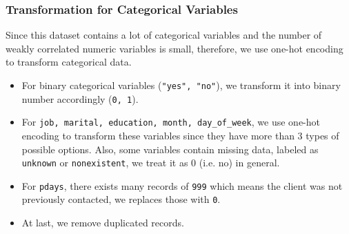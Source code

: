 \documentclass[11pt,a4paper]{article}
\begin{document}
    \subsubsection{Transformation for Categorical Variables}
    Since this dataset contains a lot of categorical variables and the number of weakly correlated numeric variables is small, therefore, we use one-hot encoding to transform categorical data.
    \begin{itemize}
        \item 
            For binary categorical variables (\texttt{"yes", "no"}), we transform it into binary number accordingly (\texttt{0, 1}).
            
        \item
            For \texttt{job, marital, education, month, day\_of\_week}, we use one-hot encoding to transform these variables since they have more than 3 types of possible options. Also, some variables contain missing data, labeled as \texttt{unknown} or \texttt{nonexistent}, we treat it as 0 (i.e. no) in general.
        
        \item
            For \texttt{pdays}, there exists many records of \texttt{999} which means the client was not previously contacted, we replaces those with \texttt{0}.
        
        \item
            At last, we remove duplicated records.
    \end{itemize}

    
    


\end{document}
